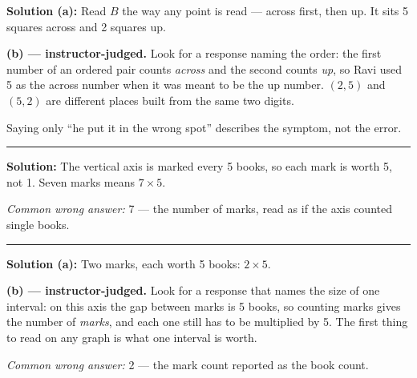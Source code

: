 \documentclass[12pt]{article}
\begin{document}




\textbf{Solution (a):} Read $B$ the way any point is read --- across first, then up. It sits 5 squares across and 2 squares up. 

\textbf{(b) --- instructor-judged.} Look for a response naming the order: the first number of an ordered pair counts \emph{across} and the second counts \emph{up}, so Ravi used 5 as the across number when it was meant to be the up number. $(2, 5)$ and $(5, 2)$ are different places built from the same two digits.

Saying only ``he put it in the wrong spot'' describes the symptom, not the error.

\vspace{0.15cm}\noindent\rule{\linewidth}{0.2pt}\vspace{0.15cm}


\textbf{Solution:} The vertical axis is marked every 5 books, so each mark is worth 5, not 1. Seven marks means $7 \times 5$. 

\emph{Common wrong answer:} 7 --- the number of marks, read as if the axis counted single books.

\vspace{0.15cm}\noindent\rule{\linewidth}{0.2pt}\vspace{0.15cm}


\textbf{Solution (a):} Two marks, each worth 5 books: $2 \times 5$. 

\textbf{(b) --- instructor-judged.} Look for a response that names the size of one interval: on this axis the gap between marks is 5 books, so counting marks gives the number of \emph{marks}, and each one still has to be multiplied by 5. The first thing to read on any graph is what one interval is worth.

\emph{Common wrong answer:} 2 --- the mark count reported as the book count.
\end{document}
